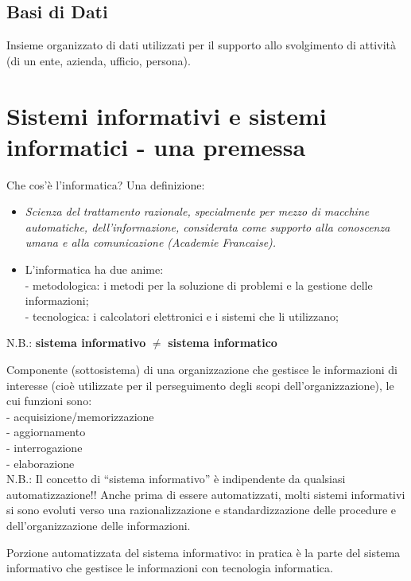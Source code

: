 \subsection{Basi di Dati}
Insieme organizzato di dati utilizzati per il supporto allo svolgimento di attività (di un ente, azienda, ufficio, persona).

\section{Sistemi informativi e sistemi informatici - una premessa}
Che cos'è l'informatica? Una definizione:
\begin{itemize}
    \item \textit{Scienza del trattamento razionale, specialmente per mezzo di macchine automatiche, dell'informazione, considerata come supporto alla conoscenza umana e alla comunicazione (Academie Francaise).}
    \item L'informatica ha due anime:
    \\- metodologica: i metodi per la soluzione di problemi e la gestione delle informazioni;
    \\- tecnologica: i calcolatori elettronici e i sistemi che li utilizzano; 
\end{itemize}
\begin{description}
    \item N.B.: \textbf{sistema informativo} $\neq$ \textbf{sistema informatico}
    \item[Sistema informativo] Componente (sottosistema) di una organizzazione che gestisce le informazioni di interesse (cioè utilizzate per il perseguimento degli scopi dell'organizzazione), le cui funzioni sono:
    \\ - acquisizione/memorizzazione
    \\ - aggiornamento
    \\ - interrogazione
    \\ - elaborazione
    \\N.B.: Il concetto di “sistema informativo” è indipendente da qualsiasi automatizzazione!! Anche prima di essere automatizzati, molti sistemi informativi si sono evoluti verso una razionalizzazione e standardizzazione delle procedure e dell'organizzazione delle informazioni.
    \item[Sistema informatico] Porzione automatizzata del sistema informativo: in pratica è la parte del sistema informativo che gestisce le informazioni con tecnologia informatica.
\end{description}
